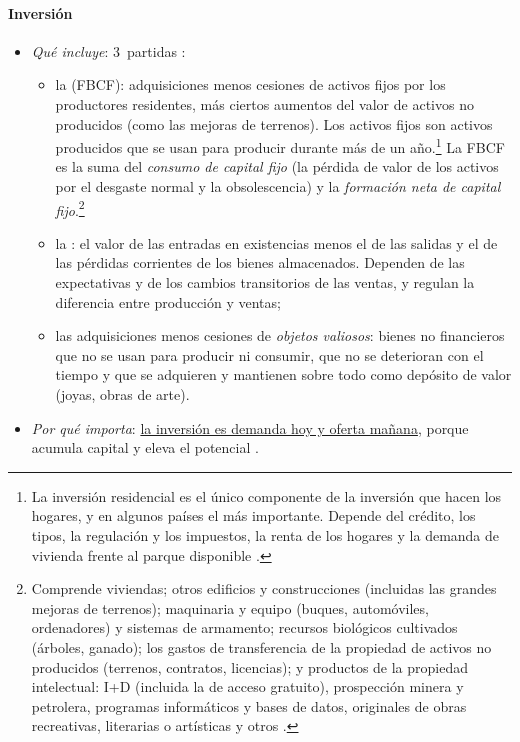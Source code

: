 \documentclass[11pt]{article}
\begin{document}
\paragraph{Inversión}
\begin{itemize}
\item \emph{Qué incluye}: 3~partidas \parencite{SEC2010}:
  \begin{itemize}
  \item la  (FBCF): adquisiciones menos cesiones de activos fijos por los productores residentes, más ciertos aumentos del valor de activos no producidos (como las mejoras de terrenos). Los activos fijos son activos producidos que se usan para producir durante más de un año.\footnote{La inversión residencial es el único componente de la inversión que hacen los hogares, y en algunos países el más importante. Depende del crédito, los tipos, la regulación y los impuestos, la renta de los hogares y la demanda de vivienda frente al parque disponible .} La FBCF es la suma del \emph{consumo de capital fijo} (la pérdida de valor de los activos por el desgaste normal y la obsolescencia) y la \emph{formación neta de capital fijo}.\footnote{Comprende viviendas; otros edificios y construcciones (incluidas las grandes mejoras de terrenos); maquinaria y equipo (buques, automóviles, ordenadores) y sistemas de armamento; recursos biológicos cultivados (árboles, ganado); los gastos de transferencia de la propiedad de activos no producidos (terrenos, contratos, licencias); y productos de la propiedad intelectual: I+D (incluida la de acceso gratuito), prospección minera y petrolera, programas informáticos y bases de datos, originales de obras recreativas, literarias o artísticas y otros \parencite{SEC2010}.}
  \item la : el valor de las entradas en existencias menos el de las salidas y el de las pérdidas corrientes de los bienes almacenados. Dependen de las expectativas y de los cambios transitorios de las ventas, y regulan la diferencia entre producción y ventas;
  \item las adquisiciones menos cesiones de \emph{objetos valiosos}: bienes no financieros que no se usan para producir ni consumir, que no se deterioran con el tiempo y que se adquieren y mantienen sobre todo como depósito de valor (joyas, obras de arte).
  \end{itemize}
\item \emph{Por qué importa}: \uline{la inversión es demanda hoy y oferta mañana}, porque acumula capital y eleva el potencial .

\end{itemize}
\end{document}
